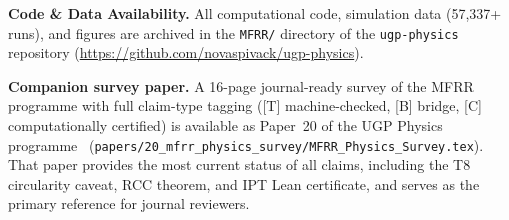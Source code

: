 \documentclass[11pt]{article}
\begin{document}
\vspace{1em}
\noindent\textbf{Code \& Data Availability.}
All computational code, simulation data (57,337+ runs), and figures are archived in the \texttt{MFRR/} directory of the \texttt{ugp-physics} repository (\url{https://github.com/novaspivack/ugp-physics}).

\vspace{0.8em}
\noindent\textbf{Companion survey paper.}
A 16-page journal-ready survey of the MFRR programme with full claim-type tagging ([T] machine-checked, [B] bridge, [C] computationally certified) is available as Paper~20 of the UGP Physics programme~\cite{SpivackResearchProgrammes} (\texttt{papers/20\_mfrr\_physics\_survey/MFRR\_Physics\_Survey.tex}). That paper provides the most current status of all claims, including the T8 circularity caveat, RCC theorem, and IPT Lean certificate, and serves as the primary reference for journal reviewers.
\end{document}
